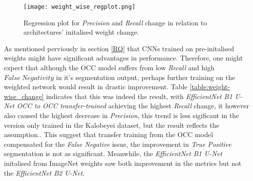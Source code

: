 \documentclass[11pt, a4paper, twoside]{report}
\begin{document}
\begin{table}[H]
  \centering
  \label{table:weight-wise_change}
  \caption{Initalised weight change in available CNNs and their effects on the metrics}
\end{table}

\begin{figure}[H]
  \centering
  \texttt{[image: weight\_wise\_regplot.png]}
  \caption{Regression plot for \textit{Precision} and \textit{Recall} change in relation to architectures' initalised weight change.}
  \label{fig:weight_regplot}
\end{figure}

As mentioned perviously in section \ref{RQ} that CNNs trained on pre-initalised weights might have significant advantages in performance. Therefore, one might expect that although the OCC model suffers from low \textit{Recall} and high $False\ Negativity$ in it's segmentation output, perhaps further training on the weighted network would result in drastic improvement. Table \ref{table:weight-wise_change} indicates that this was indeed the result, with \textit{EfficientNet B1 U-Net OCC to OCC transfer-trained} achieving the highest \textit{Recall} change, it however also caused the highest decrease in \textit{Precision}, this trend is less sigificant in the version only trained in the Kalobeyei dataset, but the result reflects the assumption.. This suggest that transfer training from the OCC model compensated for the \textit{False Negative} issue, the improvement in \textit{True Positive} segmentation is not as significant. Meanwhile, the \textit{EfficientNet B1 U-Net} initalised from ImageNet weights saw both improvement in the metrics but not the \textit{EfficientNet B2 U-Net}.\\\par
\end{document}
